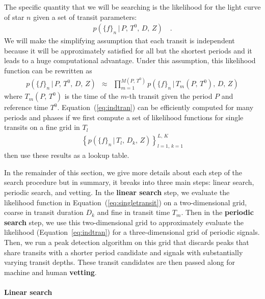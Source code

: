 \documentclass[12pt,preprint]{aastex}
\newcommand{\Eq}[1]{Equation~(\ref{eq:#1})}
\newcommand{\eq}[1]{\Eq{#1}}
\newcommand{\eqalt}[1]{Equation~\ref{eq:#1}}
\newcommand{\eqlabel}[1]{\label{eq:#1}}
\newcommand{\flux}{{\ensuremath{f}}}
\newcommand{\period}{{\ensuremath{P}}}
\newcommand{\phase}{{\ensuremath{T^0}}}
\newcommand{\duration}{{\ensuremath{D}}}
\newcommand{\depth}{{\ensuremath{Z}}}
\newcommand{\transittime}{{\ensuremath{T}}}
\begin{document}
The specific quantity that we will be searching is the likelihood for the
light curve of star $n$ given a set of transit parameters:
\begin{eqnarray}
p(\{\flux\}_n\,|\,\period,\,\phase,\,\duration,\,\depth) \quad.
\end{eqnarray}
We will make the simplifying assumption that each transit is independent
because it will be approximately satisfied for all but the shortest periods
and it leads to a huge computational advantage.
Under this assumption, this likelihood function can be rewritten as
\begin{eqnarray}\eqlabel{indtran}
p(\{\flux\}_n\,|\,\period,\,\phase,\,\duration,\,\depth) &\approx&
\prod_{m=1}^{M(\period,\,\phase)}
    p(\{\flux\}_n\,|\,\transittime_m(\period,\,\phase),\,\duration,\,
                    \depth)
\end{eqnarray}
where $\transittime_m(\period,\,\phase)$ is the time of the $m$-th
transit given the period $\period$ and reference time $\phase$.
\Eq{indtran} can be efficiently computed for many periods and phases if we
first compute a set of likelihood functions for single transits on a fine grid
in $\transittime_l$
\begin{eqnarray}\eqlabel{singletransit}
\left \{ p(\{\flux\}_n\,|\,\transittime_l,\,\duration_k,\,\depth)
\right\}_{l=1,\,k=1}^{L,\,K}
\end{eqnarray}
then use these results as a lookup table.

In the remainder of this section, we give more details about each step of the
search procedure but in summary, it breaks into three main steps: linear
search, periodic search, and vetting.
In the {\bf linear search} step, we evaluate the likelihood function in
\eq{singletransit} on a two-dimensional grid, coarse in transit duration
$\duration_k$ and fine in transit time $\transittime_m$.
Then in the {\bf periodic search} step, we use this two-dimensional grid to
approximately evaluate the likelihood (\eqalt{indtran}) for a
three-dimensional grid of periodic signals.
Then, we run a peak detection algorithm on this grid that discards peaks that
share transits with a shorter period candidate and signals with substantially
varying transit depths.
These transit candidates are then passed along for machine and human {\bf
vetting}.


\paragraph{Linear search}
\end{document}
